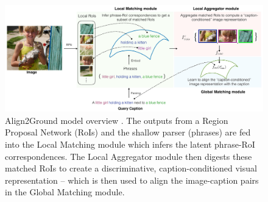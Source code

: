 \begin{figure}
  \centering
  \includegraphics[width=.8\textwidth]{figures/align2ground-model.png}
  \caption[Align2Ground model overview]{Align2Ground model overview
  \cite{datta2019align2ground}. The outputs from a Region Proposal
  Network (RoIs) and the shallow parser (phrases) are fed into the
  Local Matching module which infers the latent phrase-RoI
  correspondences. The Local Aggregator module then digests these
  matched RoIs to create a discriminative, caption-conditioned visual
  representation -- which is then used to align the image-caption
  pairs in the Global Matching module.}
  \label{fig:align2ground-model}
\end{figure}

